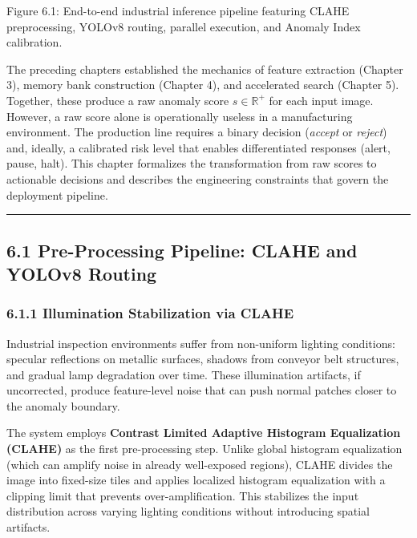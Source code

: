 Figure 6.1: End-to-end industrial inference pipeline featuring CLAHE preprocessing, YOLOv8 routing, parallel execution, and Anomaly Index calibration.

The preceding chapters established the mechanics of feature extraction (Chapter 3), memory bank construction (Chapter 4), and accelerated search (Chapter 5). Together, these produce a raw anomaly score \(s \in \mathbb{R}^+\) for each input image. However, a raw score alone is operationally useless in a manufacturing environment. The production line requires a binary decision (\emph{accept} or \emph{reject}) and, ideally, a calibrated risk level that enables differentiated responses (alert, pause, halt). This chapter formalizes the transformation from raw scores to actionable decisions and describes the engineering constraints that govern the deployment pipeline.

\begin{center}\rule{0.5\linewidth}{0.5pt}\end{center}

\subsection{6.1 Pre-Processing Pipeline: CLAHE and YOLOv8 Routing}\label{pre-processing-pipeline-clahe-and-yolov8-routing}

\subsubsection{6.1.1 Illumination Stabilization via CLAHE}\label{illumination-stabilization-via-clahe}

Industrial inspection environments suffer from non-uniform lighting conditions: specular reflections on metallic surfaces, shadows from conveyor belt structures, and gradual lamp degradation over time. These illumination artifacts, if uncorrected, produce feature-level noise that can push normal patches closer to the anomaly boundary.

The system employs \textbf{Contrast Limited Adaptive Histogram Equalization (CLAHE)} as the first pre-processing step. Unlike global histogram equalization (which can amplify noise in already well-exposed regions), CLAHE divides the image into fixed-size tiles and applies localized histogram equalization with a clipping limit that prevents over-amplification. This stabilizes the input distribution across varying lighting conditions without introducing spatial artifacts.

